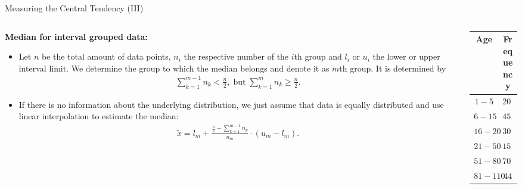\begin{frame}{Measuring the Central Tendency (III)}
  \begin{columns}
    \begin{column}{0.6\textwidth}
      \textbf{Median for interval grouped data:}
      \begin{itemize}[noitemsep]
      \item Let $n$ be the total amount of data points, $n_i$ the respective number of the $i$th group and $l_i$ or $u_i$ the lower or upper interval limit. We determine the group to which the median belongs and denote it as $m$th group. It is determined by
        \begin{align}
          \sum_{k=1}^{m-1}n_k < \frac{n}{2}, \; \text{but} \; \sum_{k=1}^{m} n_k \geq \frac{n}{2}.
        \end{align}
      \item If there is no information about the underlying distribution, we just assume that data is equally distributed and use linear interpolation to estimate the median:
        \begin{align}
          \tilde{x} = l_m + \frac{\frac{n}{2}-\sum_{k=1}^{m-1}n_k}{n_m} \cdot (u_m-l_m).
        \end{align}
      \end{itemize}
    \end{column}
    \begin{column}{0.3\textwidth}  %
      \begin{table}
        \begin{tabular}{|c|c|}
          Age & Frequency \\ \hline
          $1-5$ & $200$ \\
          $6-15$ & $450$ \\
          $16-20$ & $300$ \\
          $21-50$ & $1500$ \\
          $51-80$ & $700$ \\
          $81-110$ & $44$
        \end{tabular}\\[0.5cm]
      \end{table}
    \end{column}
  \end{columns}
\end{frame}

